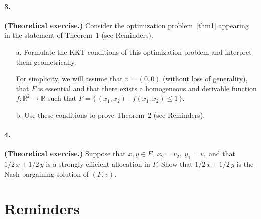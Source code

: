 \documentclass[a4paper,notitlepage,11pt]{article}
\begin{document}
\paragraph{3. } \textbf{(Theoretical exercise.)} Consider the optimization problem~\eqref{thm1} appearing in the statement of Theorem~1 (see Reminders).
\begin{enumerate}
	\item[a.] Formulate the KKT conditions of this optimization problem and interpret them geometrically.
	
	For simplicity, we will assume that $v = (0, 0)$ (without loss of generality), that $F$ is essential and that there exists a homogeneous and derivable function $f : \mathbb{R}^2 \rightarrow \mathbb{R}$ such that $F = \{ \, (x_1, x_2) \; | \; f(x_1, x_2) \leq 1 \, \}$.
	\item[b.] Use these conditions to prove Theorem~2 (see Reminders).
\end{enumerate}

	
\paragraph{4. } \textbf{(Theoretical exercise.)} Suppose that $x, y \in F, \; x_2 = v_2, \; y_1 = v_1$ and that $1/2 \, x + 1/2 \, y$ is a strongly efficient allocation in $F$. Show that $1/2 \, x + 1/2 \, y$ is the Nash bargaining solution of $(F,v)$.
	
\newpage

\section*{Reminders}
\end{document}
